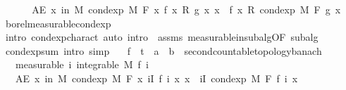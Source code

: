 \begin{isabellebody}
\ \ \isacommand{{\isacharbraceright}{\kern0pt}}\isamarkupfalse%
\isanewline
\ \ \isamarkupfalse%
\ {\isachardoublequoteopen}AE\ x\ in\ M{\isachardot}{\kern0pt}\ cond{\isacharunderscore}{\kern0pt}exp\ M\ F\ {\isacharparenleft}{\kern0pt}{\isasymlambda}x{\isachardot}{\kern0pt}\ f\ x\ {\isacharasterisk}{\kern0pt}\isactrlsub R\ g\ x{\isacharparenright}{\kern0pt}\ x\ {\isacharequal}{\kern0pt}\ f\ x\ {\isacharasterisk}{\kern0pt}\isactrlsub R\ cond{\isacharunderscore}{\kern0pt}exp\ M\ F\ g\ x{\isachardoublequoteclose}\ \isamarkupfalse%
\ borel{\isacharunderscore}{\kern0pt}measurable{\isacharunderscore}{\kern0pt}cond{\isacharunderscore}{\kern0pt}exp\ \isamarkupfalse%
\ {\isacharparenleft}{\kern0pt}intro\ cond{\isacharunderscore}{\kern0pt}exp{\isacharunderscore}{\kern0pt}charact{\isacharcomma}{\kern0pt}\ auto\ intro{\isacharbang}{\kern0pt}{\isacharcolon}{\kern0pt}\ {\isacharasterisk}{\kern0pt}\ assms\ measurable{\isacharunderscore}{\kern0pt}in{\isacharunderscore}{\kern0pt}subalg{\isacharbrackleft}{\kern0pt}OF\ subalg{\isacharbrackright}{\kern0pt}{\isacharparenright}{\kern0pt}\isanewline
{}\isamarkupfalse%
%
\endisatagproof
{\isafoldproof}%
%
\isadelimproof
\isanewline
%
\endisadelimproof
\isanewline
{}\isamarkupfalse%
\ cond{\isacharunderscore}{\kern0pt}exp{\isacharunderscore}{\kern0pt}sum\ {\isacharbrackleft}{\kern0pt}intro{\isacharcomma}{\kern0pt}\ simp{\isacharbrackright}{\kern0pt}{\isacharcolon}{\kern0pt}\isanewline
\ \ \ f\ {\isacharcolon}{\kern0pt}{\isacharcolon}{\kern0pt}\ {\isachardoublequoteopen}{\isacharprime}{\kern0pt}t\ {\isasymRightarrow}\ {\isacharprime}{\kern0pt}a\ {\isasymRightarrow}\ {\isacharprime}{\kern0pt}b\ {\isacharcolon}{\kern0pt}{\isacharcolon}{\kern0pt}\ {\isacharbraceleft}{\kern0pt}second{\isacharunderscore}{\kern0pt}countable{\isacharunderscore}{\kern0pt}topology{\isacharcomma}{\kern0pt}banach{\isacharbraceright}{\kern0pt}{\isachardoublequoteclose}\isanewline
\ \ \ {\isacharbrackleft}{\kern0pt}measurable{\isacharbrackright}{\kern0pt}{\isacharcolon}{\kern0pt}\ {\isachardoublequoteopen}{\isasymAnd}i{\isachardot}{\kern0pt}\ integrable\ M\ {\isacharparenleft}{\kern0pt}f\ i{\isacharparenright}{\kern0pt}{\isachardoublequoteclose}\isanewline
\ \ \ {\isachardoublequoteopen}AE\ x\ in\ M{\isachardot}{\kern0pt}\ cond{\isacharunderscore}{\kern0pt}exp\ M\ F\ {\isacharparenleft}{\kern0pt}{\isasymlambda}x{\isachardot}{\kern0pt}\ {\isasymSum}i{\isasymin}I{\isachardot}{\kern0pt}\ f\ i\ x{\isacharparenright}{\kern0pt}\ x\ {\isacharequal}{\kern0pt}\ {\isacharparenleft}{\kern0pt}{\isasymSum}i{\isasymin}I{\isachardot}{\kern0pt}\ cond{\isacharunderscore}{\kern0pt}exp\ M\ F\ {\isacharparenleft}{\kern0pt}f\ i{\isacharparenright}{\kern0pt}\ x{\isacharparenright}{\kern0pt}{\isachardoublequoteclose}\isanewline

\end{isabellebody}

